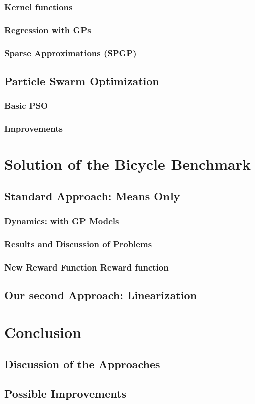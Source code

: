 \subsection{Kernel functions}
\subsection{Regression with GPs}
\subsection{Sparse Approximations (SPGP)}
\section{Particle Swarm Optimization}
\subsection{Basic PSO}
\subsection{Improvements}

\chapter{Solution of the Bicycle Benchmark}
\section{Standard Approach: Means Only}
\subsection{Dynamics: with GP Models}
\subsection{Results and Discussion of Problems}
\subsection{New Reward Function Reward function}
\section{Our second Approach: Linearization}

\chapter{Conclusion}
\section{Discussion of the Approaches}
\section{Possible Improvements}

\appendix

\nocite{*}
\printbibliography
\listoffigures
\listoftables
\listoflistings


